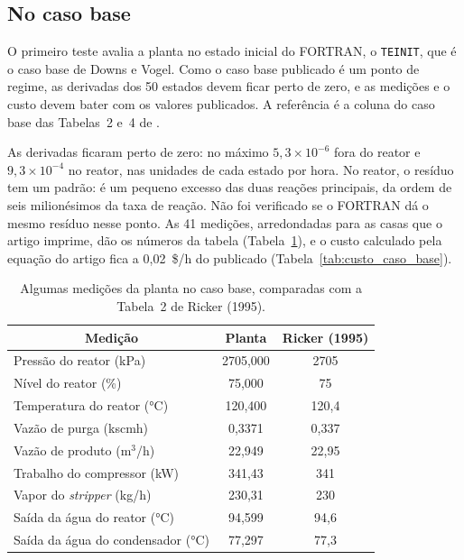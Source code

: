 \subsection{No caso base}
\label{subsec:val_caso_base}

O primeiro teste avalia a planta no estado inicial do FORTRAN, o \texttt{TEINIT}, que é o caso base de Downs e Vogel. Como o caso base publicado é um ponto de regime, as derivadas dos 50 estados devem ficar perto de zero, e as medições e o custo devem bater com os valores publicados. A referência é a coluna do caso base das Tabelas~2 e~4 de .

As derivadas ficaram perto de zero: no máximo $5{,}3\times10^{-6}$ fora do reator e $9{,}3\times10^{-4}$ no reator, nas unidades de cada estado por hora. No reator, o resíduo tem um padrão: é um pequeno excesso das duas reações principais, da ordem de seis milionésimos da taxa de reação. Não foi verificado se o FORTRAN dá o mesmo resíduo nesse ponto. As 41 medições, arredondadas para as casas que o artigo imprime, dão os números da tabela (Tabela~\ref{tab:xmeas_caso_base}), e o custo calculado pela equação do artigo fica a 0,02~\$/h do publicado (Tabela~\ref{tab:custo_caso_base}).

\begin{table}[htbp]
	\centering
	\caption{Algumas medições da planta no caso base, comparadas com a Tabela~2 de Ricker (1995).}
	\label{tab:xmeas_caso_base}
	\footnotesize
	\begin{tabular}{lcc}
		\hline
		\multicolumn{1}{c|}{\textbf{Medição}} & \multicolumn{1}{c|}{\textbf{Planta}} & \multicolumn{1}{c}{\textbf{Ricker (1995)}} \\
		\hline
		Pressão do reator (kPa) & 2705,000 & 2705 \\
		Nível do reator (\%) & 75,000 & 75 \\
		Temperatura do reator (°C) & 120,400 & 120,4 \\
		Vazão de purga (kscmh) & 0,3371 & 0,337 \\
		Vazão de produto (m$^3$/h) & 22,949 & 22,95 \\
		Trabalho do compressor (kW) & 341,43 & 341 \\
		Vapor do \textit{stripper} (kg/h) & 230,31 & 230 \\
		Saída da água do reator (°C) & 94,599 & 94,6 \\
		Saída da água do condensador (°C) & 77,297 & 77,3 \\
		\hline
	\end{tabular}
\end{table}

